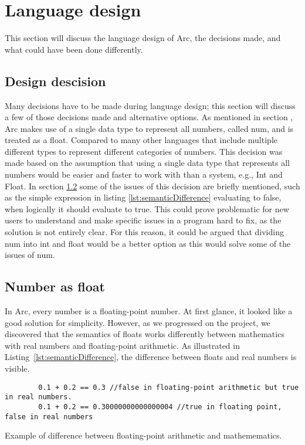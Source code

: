 \section{Language design}

This section will discuss the language design of Arc, the decisions made, and what could have been done differently.

\subsection{Design descision} 
Many decisions have to be made during language design; this section will discuss a few of those decisions made and alternative options.
As mentioned in section , Arc makes use of a single data type to represent all numbers, called num, and is treated as a float. Compared to many other languages that include multiple different types to represent different categories of numbers. This decision was made based on the assumption that using a single data type that represents all numbers would be easier and faster to work with than a system, e.g., Int and Float. In section \ref{subsec:numberAsFloats} some of the issues of this decision are briefly mentioned, such as the simple expression in listing \ref{lst:semanticDifference} evaluating to false, when logically it should evaluate to true. This could prove problematic for new users to understand and make specific issues in a program hard to fix, as the solution is not entirely clear. For this reason, it could be argued that dividing num into int and float would be a better option as this would solve some of the issues of num.



\subsection{Number as float}\label{subsec:numberAsFloats}
In Arc, every number is a floating-point number. At first glance, it looked like a good solution for simplicity. However, as we progressed on the project, we discovered that the semantics of floats works differently between mathematics with real numbers and floating-point arithmetic. As illustrated in Listing~\ref{lst:semanticDifference}, the difference between floats and real numbers is visible.


\begin{listing}[htb!]
    \begin{verbatim}
        0.1 + 0.2 == 0.3 //false in floating-point arithmetic but true in real numbers.
        0.1 + 0.2 == 0.30000000000000004 //true in floating point, false in real numbers
    \end{verbatim}
    \caption{Example of difference between floating-point arithmetic and mathemematics.}
    \label{lst:semanticDifference}
\end{listing}



